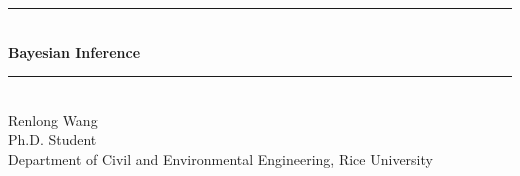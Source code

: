 \documentclass[10pt,a4paper]{book}
\numberwithin{figure}{chapter}
\numberwithin{table}{chapter}
\newcommand{\HRule}[1]{\rule{\linewidth}{#1}}
\begin{document}
\begin{titlepage}
    \centering

    \HRule{1.5pt} \\ [1em]
    {\huge\bfseries{Bayesian Inference}} \\ 
    \HRule{1.5pt} \\

    \vfill
    \vspace*{0.5cm}
    {\Large Renlong Wang} \\  [0.25em]

    Ph.D. Student \\
    Department of Civil and Environmental Engineering, Rice University
\end{titlepage}


\setcounter{page}{0}
\thispagestyle{empty}

\tableofcontents
\newpage






\end{document}
